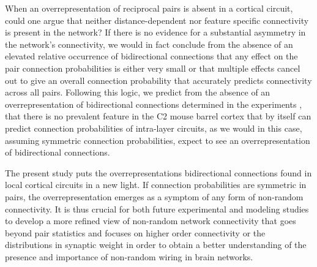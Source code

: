 When an overrepresentation of reciprocal pairs is absent in a cortical circuit, could one argue that neither distance-dependent nor feature specific connectivity is present in the network?
%
If there is no evidence for a substantial asymmetry in the network's connectivity, we would in fact conclude from the absence of an elevated relative occurrence of bidirectional connections that any effect on the pair connection probabilities is either very small or that multiple effects cancel out to give an overall connection probability that accurately predicts connectivity across all pairs.
%
%
Following this logic, we predict from the absence of an overrepresentation of bidirectional connections determined in the experiments \textcite{Lefort2009}, that there is no prevalent feature in the C2 mouse barrel cortex that by itself can predict connection probabilities of intra-layer circuits, as we would in this case, assuming symmetric connection probabilities, expect to see an overrepresentation of bidirectional connections. 

The present study puts the overrepresentations bidirectional connections found in local cortical circuits in a new light.
%
If connection probabilities are symmetric in pairs, the overrepresentation emerges as a symptom of any form of non-random connectivity.
%
It is thus crucial for both future experimental and modeling studies to develop a more refined view of non-random network connectivity that goes beyond pair statistics and focuses on higher order connectivity or the distributions in synaptic weight in order to obtain a better understanding of the presence and importance of non-random wiring in brain networks.

